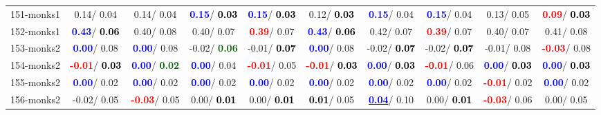 \begin{table}[h]
\begin{center}
{\begin{tabular}{lc|c|c|c|c|c|c|c|c}
151-monks1 &   0.14/  0.04 &   0.14/  0.04 & \textcolor{blue}{\textbf{  0.15}}/\textcolor{black}{\textbf{  0.03}} & \textcolor{blue}{\textbf{  0.15}}/\textcolor{black}{\textbf{  0.03}} &   0.12/\textcolor{black}{\textbf{  0.03}} & \textcolor{blue}{\textbf{  0.15}}/  0.04 & \textcolor{blue}{\textbf{  0.15}}/  0.04 &   0.13/  0.05 & \textcolor{red}{\textbf{  0.09}}/\textcolor{black}{\textbf{  0.03}} \\
152-monks1 & \textcolor{blue}{\textbf{  0.43}}/\textcolor{black}{\textbf{  0.06}} &   0.40/  0.08 &   0.40/  0.07 & \textcolor{red}{\textbf{  0.39}}/  0.07 & \textcolor{blue}{\textbf{  0.43}}/\textcolor{black}{\textbf{  0.06}} &   0.42/  0.07 & \textcolor{red}{\textbf{  0.39}}/  0.07 &   0.40/  0.07 &   0.41/  0.08 \\
153-monks2 & \textcolor{blue}{\textbf{  0.00}}/  0.08 & \textcolor{blue}{\textbf{  0.00}}/  0.08 &  -0.02/\textcolor{darkgreen}{\textbf{  0.06}} &  -0.01/\textcolor{black}{\textbf{  0.07}} & \textcolor{blue}{\textbf{  0.00}}/  0.08 &  -0.02/\textcolor{black}{\textbf{  0.07}} &  -0.02/\textcolor{black}{\textbf{  0.07}} &  -0.01/  0.08 & \textcolor{red}{\textbf{ -0.03}}/  0.08 \\
154-monks2 & \textcolor{red}{\textbf{ -0.01}}/\textcolor{black}{\textbf{  0.03}} & \textcolor{blue}{\textbf{  0.00}}/\textcolor{darkgreen}{\textbf{  0.02}} & \textcolor{blue}{\textbf{  0.00}}/  0.04 & \textcolor{red}{\textbf{ -0.01}}/  0.05 & \textcolor{red}{\textbf{ -0.01}}/\textcolor{black}{\textbf{  0.03}} & \textcolor{blue}{\textbf{  0.00}}/\textcolor{black}{\textbf{  0.03}} & \textcolor{red}{\textbf{ -0.01}}/  0.06 & \textcolor{blue}{\textbf{  0.00}}/\textcolor{black}{\textbf{  0.03}} & \textcolor{blue}{\textbf{  0.00}}/\textcolor{black}{\textbf{  0.03}} \\
155-monks2 & \textcolor{blue}{\textbf{  0.00}}/  0.02 & \textcolor{blue}{\textbf{  0.00}}/  0.02 & \textcolor{blue}{\textbf{  0.00}}/  0.02 & \textcolor{blue}{\textbf{  0.00}}/  0.02 & \textcolor{blue}{\textbf{  0.00}}/  0.02 & \textcolor{blue}{\textbf{  0.00}}/  0.02 & \textcolor{blue}{\textbf{  0.00}}/  0.02 & \textcolor{red}{\textbf{ -0.01}}/  0.02 & \textcolor{blue}{\textbf{  0.00}}/  0.02 \\
156-monks2 &  -0.02/  0.05 & \textcolor{red}{\textbf{ -0.03}}/  0.05 &   0.00/\textcolor{black}{\textbf{  0.01}} &   0.00/\textcolor{black}{\textbf{  0.01}} & \textcolor{black}{\textbf{  0.01}}/  0.05 & \underline{\textcolor{blue}{\textbf{  0.04}}}/  0.10 &   0.00/\textcolor{black}{\textbf{  0.01}} & \textcolor{red}{\textbf{ -0.03}}/  0.06 &   0.00/  0.05 \\ \hline

\end{tabular}}
\end{center}
\end{table}
